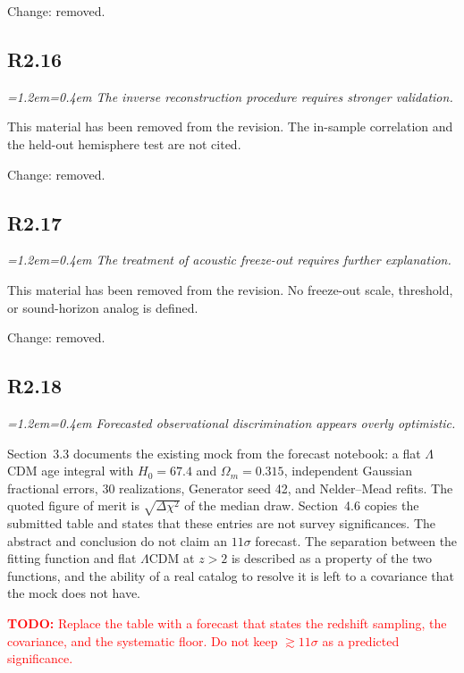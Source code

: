 \documentclass[11pt,a4paper]{article}
\newenvironment{review}{\par\color{revcolor}\itshape\leftskip=1.2em\rightskip=0.4em\noindent}{\par\leftskip=0pt\rightskip=0pt}
\newcommand{\revtodo}[1]{\textcolor{red}{\textbf{TODO:} #1}}
\begin{document}
Change: removed.

\subsection*{R2.16}
\begin{review}
The inverse reconstruction procedure requires stronger validation.
\end{review}

This material has been removed from the revision.
The in-sample correlation and the held-out hemisphere test are not cited.

Change: removed.

\subsection*{R2.17}
\begin{review}
The treatment of acoustic freeze-out requires further explanation.
\end{review}

This material has been removed from the revision.
No freeze-out scale, threshold, or sound-horizon analog is defined.

Change: removed.

\subsection*{R2.18}
\begin{review}
Forecasted observational discrimination appears overly optimistic.
\end{review}

Section~3.3 documents the existing mock from the forecast notebook: a flat $\Lambda$CDM age integral with $H_0 = 67.4$ and $\Omega_m = 0.315$, independent Gaussian fractional errors, 30 realizations, Generator seed 42, and Nelder--Mead refits.
The quoted figure of merit is $\sqrt{\Delta\chi^2}$ of the median draw.
Section~4.6 copies the submitted table and states that these entries are not survey significances.
The abstract and conclusion do not claim an $11\sigma$ forecast.
The separation between the fitting function and flat $\Lambda$CDM at $z>2$ is described as a property of the two functions, and the ability of a real catalog to resolve it is left to a covariance that the mock does not have.

\revtodo{Replace the table with a forecast that states the redshift sampling, the covariance, and the systematic floor. Do not keep $\gtrsim 11\sigma$ as a predicted significance.}
\end{document}

